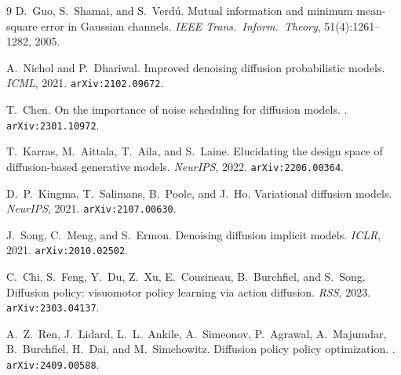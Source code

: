 \documentclass[11pt]{article}
\theoremstyle{definition}
\begin{document}
\begin{thebibliography}{9}
D.~Guo, S.~Shamai, and S.~Verd\'u.
\newblock Mutual information and minimum mean-square error in Gaussian channels.
\newblock \emph{IEEE Trans.\ Inform.\ Theory}, 51(4):1261--1282, 2005.

A.~Nichol and P.~Dhariwal.
\newblock Improved denoising diffusion probabilistic models.
\newblock \emph{ICML}, 2021. \texttt{arXiv:2102.09672}.

T.~Chen.
\newblock On the importance of noise scheduling for diffusion models.
. \texttt{arXiv:2301.10972}.

T.~Karras, M.~Aittala, T.~Aila, and S.~Laine.
\newblock Elucidating the design space of diffusion-based generative models.
\newblock \emph{NeurIPS}, 2022. \texttt{arXiv:2206.00364}.

D.~P.~Kingma, T.~Salimans, B.~Poole, and J.~Ho.
\newblock Variational diffusion models.
\newblock \emph{NeurIPS}, 2021. \texttt{arXiv:2107.00630}.

J.~Song, C.~Meng, and S.~Ermon.
\newblock Denoising diffusion implicit models.
\newblock \emph{ICLR}, 2021. \texttt{arXiv:2010.02502}.

C.~Chi, S.~Feng, Y.~Du, Z.~Xu, E.~Cousineau, B.~Burchfiel, and S.~Song.
\newblock Diffusion policy: visuomotor policy learning via action diffusion.
\newblock \emph{RSS}, 2023. \texttt{arXiv:2303.04137}.

A.~Z.~Ren, J.~Lidard, L.~L.~Ankile, A.~Simeonov, P.~Agrawal, A.~Majumdar,
B.~Burchfiel, H.~Dai, and M.~Simchowitz.
\newblock Diffusion policy policy optimization.
. \texttt{arXiv:2409.00588}.
\end{thebibliography}
\end{document}
